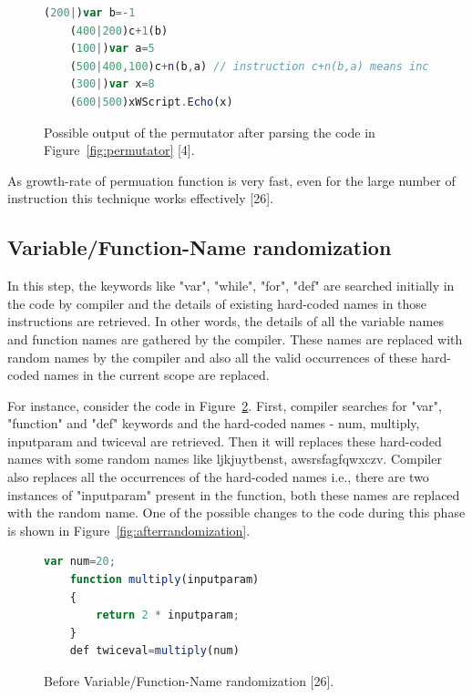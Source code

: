 \begin{figure}
  \centering
  \begin{lstlisting}[language=JavaScript]
	(200|)var b=-1
	(400|200)c+1(b)
	(100|)var a=5	
	(500|400,100)c+n(b,a) // instruction c+n(b,a) means increasing b by a: i.e. b+=a
	(300|)var x=8
	(600|500)xWScript.Echo(x)
\end{lstlisting}
    \caption[Permutator output]{Possible output of the permutator after parsing the code in Figure~\ref{fig:permutator} [4].}
    \label{fig:afterpermutator}
\end{figure}

As growth-rate of permuation function is very fast, even for the large number of instruction this technique works effectively [26].

\subsection{Variable/Function-Name randomization}

In this step, the keywords like "var", "while", "for", "def" are searched initially in the code by compiler and the details of existing hard-coded names in those instructions are retrieved. In other words, the details of all the variable names and function names are gathered by the compiler. These names are replaced with random names by the compiler and also all the valid occurrences of these hard-coded names in the current scope are replaced.

For instance, consider the code in Figure~\ref{fig:randomization}. First, compiler searches for "var", "function" and "def" keywords and the hard-coded names - num, multiply, inputparam and twiceval are retrieved. Then it will replaces these hard-coded names with some random names like ljkjuytbenst, awsrsfagfqwxczv. Compiler also replaces all the occurrences of the hard-coded names i.e., there are two instances of "inputparam" present in the function, both these names are replaced with the random name. One of the possible changes to the code during this phase is shown in Figure~\ref{fig:afterrandomization}. 

\begin{figure}
  \centering
  \begin{lstlisting}[language=JavaScript]
	var num=20;
	function multiply(inputparam) 
	{ 
		return 2 * inputparam; 
	}
	def twiceval=multiply(num)
\end{lstlisting}
    \caption[Before Variable/Function-Name randomization]{Before Variable/Function-Name randomization [26].}
    \label{fig:randomization}
\end{figure}

